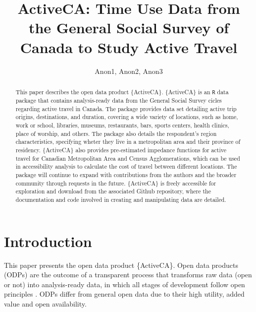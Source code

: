 \documentclass[Royal,times,sageh]{sagej}
\begin{document}

\title{ActiveCA: Time Use Data from the General Social Survey of Canada
to Study Active Travel}

\runninghead{}

\author{Anon1\affilnum{}, Anon2\affilnum{}, Anon3\affilnum{}}

\affiliation{\affilnum{}{}}



\begin{abstract}
This paper describes the open data product \{ActiveCA\}. \{ActiveCA\} is
an \texttt{R} data package that contains analysis-ready data from the
General Social Survey cicles regarding active travel in Canada. The
package provides data set detailing active trip origins, destinations,
and duration, covering a wide variety of locations, such as home, work
or school, libraries, museums, restaurants, bars, sports centers, health
clinics, place of worship, and others. The package also details the
respondent's region characteristics, specifying wheter they live in a
metropolitan area and their province of residency. \{ActiveCA\} also
provides pre-estimated impedance functions for active travel for
Canadian Metropolitan Area and Census Agglomerations, which can be used
in accessibility analysis to calculate the cost of travel between
different locations. The package will continue to expand with
contributions from the authors and the broader community through
requests in the future. \{ActiveCA\} is freely accessible for
exploration and download from the associated Github repository, where
the documentation and code involved in creating and manipulating data
are detailed.
\end{abstract}


\maketitle

\section{Introduction}\label{introduction}

This paper presents the open data product \{ActiveCA\}. Open data
products (ODPs) are the outcome of a transparent process that transforms
raw data (open or not) into analysis-ready data, in which all stages of
development follow open principles \citep{arribas-bel2021}. ODPs differ
from general open data due to their high utility, added value and open
availability.
\end{document}
